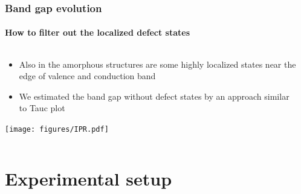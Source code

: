 \documentclass[noamsthm,8pt,t]{beamer}
\begin{document}
\begin{frame}
   \frametitle{Band gap evolution}
   \framesubtitle{How to filter out the localized defect states}

   \begin{columns}
      \begin{column}{0.5\textwidth}
         \begin{itemize}
            \item Also in the amorphous structures are some highly localized states near the edge of valence and conduction band
            \item<2> We estimated the band gap without defect states by an approach similar to Tauc plot
         \end{itemize}

         \texttt{[image: figures/IPR.pdf]}

      \end{column}
      \begin{column}{0.5\textwidth}
      \end{column}
   \end{columns}
\end{frame}

\section{Experimental setup}
\end{document}
